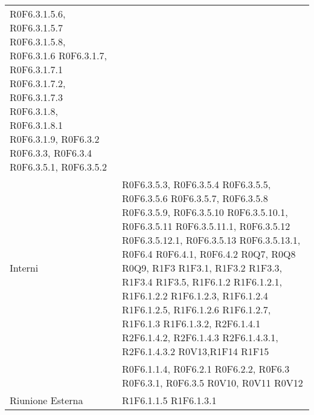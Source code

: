 \begin{longtable}{p{2.5cm}!{\VRule[1pt]}p{5.5cm}}
R0F6.3.1.5.6, R0F6.3.1.5.7 \newline
R0F6.3.1.5.8, R0F6.3.1.6 \newline
R0F6.3.1.7, R0F6.3.1.7.1 \newline
R0F6.3.1.7.2, R0F6.3.1.7.3 \newline
R0F6.3.1.8, R0F6.3.1.8.1 \newline
R0F6.3.1.9, R0F6.3.2 \newline
R0F6.3.3, R0F6.3.4 \newline
R0F6.3.5.1, R0F6.3.5.2 \\
Interni & R0F6.3.5.3, R0F6.3.5.4 \newline
R0F6.3.5.5, R0F6.3.5.6 \newline
R0F6.3.5.7, R0F6.3.5.8 \newline
R0F6.3.5.9, R0F6.3.5.10 \newline
R0F6.3.5.10.1, R0F6.3.5.11 \newline
R0F6.3.5.11.1, R0F6.3.5.12 \newline
R0F6.3.5.12.1, R0F6.3.5.13 \newline
R0F6.3.5.13.1, R0F6.4 \newline
R0F6.4.1, R0F6.4.2 \newline
R0Q7, R0Q8 \newline
R0Q9, R1F3 \newline
R1F3.1, R1F3.2 \newline
R1F3.3, R1F3.4 \newline
R1F3.5, R1F6.1.2 \newline
R1F6.1.2.1, R1F6.1.2.2 \newline
R1F6.1.2.3, R1F6.1.2.4 \newline
R1F6.1.2.5, R1F6.1.2.6 \newline
R1F6.1.2.7, R1F6.1.3 \newline
R1F6.1.3.2, R2F6.1.4.1 \newline
R2F6.1.4.2, R2F6.1.4.3 \newline
R2F6.1.4.3.1, R2F6.1.4.3.2 \newline
R0V13,R1F14 \newline
R1F15\\
 & R0F6.1.1.4, R0F6.2.1 \newline
R0F6.2.2, R0F6.3 \newline
R0F6.3.1, R0F6.3.5 \newline
R0V10, R0V11 \newline
R0V12\\
Riunione Esterna & R1F6.1.1.5 \newline
R1F6.1.3.1 \newline

\end{longtable}
